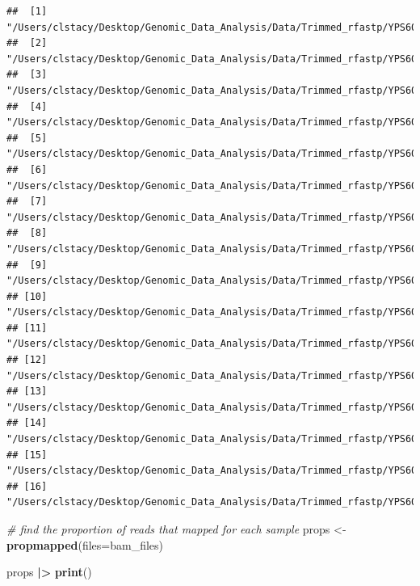 \documentclass[
]{book}
\newenvironment{Shaded}{\begin{snugshade}}{\end{snugshade}}
\newcommand{\AttributeTok}[1]{\textcolor[rgb]{0.13,0.29,0.53}{#1}}
\newcommand{\CommentTok}[1]{\textcolor[rgb]{0.56,0.35,0.01}{\textit{#1}}}
\newcommand{\FunctionTok}[1]{\textcolor[rgb]{0.13,0.29,0.53}{\textbf{#1}}}
\newcommand{\NormalTok}[1]{#1}
\newcommand{\OtherTok}[1]{\textcolor[rgb]{0.56,0.35,0.01}{#1}}
\newcommand{\SpecialCharTok}[1]{\textcolor[rgb]{0.81,0.36,0.00}{\textbf{#1}}}
\begin{document}
\begin{verbatim}
##  [1] "/Users/clstacy/Desktop/Genomic_Data_Analysis/Data/Trimmed_rfastp/YPS606_MSN24_ETOH_REP1_R1.fastq.gz.subread.BAM"
##  [2] "/Users/clstacy/Desktop/Genomic_Data_Analysis/Data/Trimmed_rfastp/YPS606_MSN24_ETOH_REP2_R1.fastq.gz.subread.BAM"
##  [3] "/Users/clstacy/Desktop/Genomic_Data_Analysis/Data/Trimmed_rfastp/YPS606_MSN24_ETOH_REP3_R1.fastq.gz.subread.BAM"
##  [4] "/Users/clstacy/Desktop/Genomic_Data_Analysis/Data/Trimmed_rfastp/YPS606_MSN24_ETOH_REP4_R1.fastq.gz.subread.BAM"
##  [5] "/Users/clstacy/Desktop/Genomic_Data_Analysis/Data/Trimmed_rfastp/YPS606_MSN24_MOCK_REP1_R1.fastq.gz.subread.BAM"
##  [6] "/Users/clstacy/Desktop/Genomic_Data_Analysis/Data/Trimmed_rfastp/YPS606_MSN24_MOCK_REP2_R1.fastq.gz.subread.BAM"
##  [7] "/Users/clstacy/Desktop/Genomic_Data_Analysis/Data/Trimmed_rfastp/YPS606_MSN24_MOCK_REP3_R1.fastq.gz.subread.BAM"
##  [8] "/Users/clstacy/Desktop/Genomic_Data_Analysis/Data/Trimmed_rfastp/YPS606_MSN24_MOCK_REP4_R1.fastq.gz.subread.BAM"
##  [9] "/Users/clstacy/Desktop/Genomic_Data_Analysis/Data/Trimmed_rfastp/YPS606_WT_ETOH_REP1_R1.fastq.gz.subread.BAM"   
## [10] "/Users/clstacy/Desktop/Genomic_Data_Analysis/Data/Trimmed_rfastp/YPS606_WT_ETOH_REP2_R1.fastq.gz.subread.BAM"   
## [11] "/Users/clstacy/Desktop/Genomic_Data_Analysis/Data/Trimmed_rfastp/YPS606_WT_ETOH_REP3_R1.fastq.gz.subread.BAM"   
## [12] "/Users/clstacy/Desktop/Genomic_Data_Analysis/Data/Trimmed_rfastp/YPS606_WT_ETOH_REP4_R1.fastq.gz.subread.BAM"   
## [13] "/Users/clstacy/Desktop/Genomic_Data_Analysis/Data/Trimmed_rfastp/YPS606_WT_MOCK_REP1_R1.fastq.gz.subread.BAM"   
## [14] "/Users/clstacy/Desktop/Genomic_Data_Analysis/Data/Trimmed_rfastp/YPS606_WT_MOCK_REP2_R1.fastq.gz.subread.BAM"   
## [15] "/Users/clstacy/Desktop/Genomic_Data_Analysis/Data/Trimmed_rfastp/YPS606_WT_MOCK_REP3_R1.fastq.gz.subread.BAM"   
## [16] "/Users/clstacy/Desktop/Genomic_Data_Analysis/Data/Trimmed_rfastp/YPS606_WT_MOCK_REP4_R1.fastq.gz.subread.BAM"
\end{verbatim}

\begin{Shaded}
\begin{Highlighting}[]
\CommentTok{\# find the proportion of reads that mapped for each sample}
\NormalTok{props }\OtherTok{\textless{}{-}} \FunctionTok{propmapped}\NormalTok{(}\AttributeTok{files=}\NormalTok{bam\_files)}

\NormalTok{props }\SpecialCharTok{|\textgreater{}} \FunctionTok{print}\NormalTok{()}
\end{Highlighting}
\end{Shaded}
\end{document}

